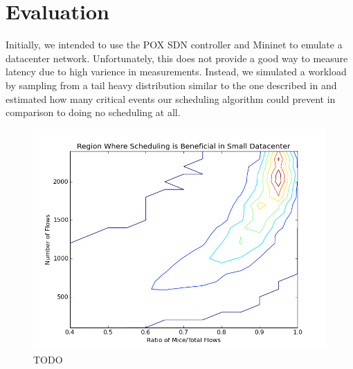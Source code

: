 \section{Evaluation}
Initially, we intended to use the POX SDN controller and Mininet to emulate a
datacenter network. Unfortunately, this does not provide a good way to measure
latency due to high varience in measurements. Instead, we simulated a workload
by sampling from a tail heavy distribution similar to the one described in
\cite{dctcp} and estimated how many critical events our scheduling algorithm
could prevent in comparison to doing no scheduling at all.

\begin{figure}[H]
	\centering
	\includegraphics[width=\columnwidth]{small_datacenter.png}
	\caption{TODO}
	\label{fig:smalldc}
\end{figure}


